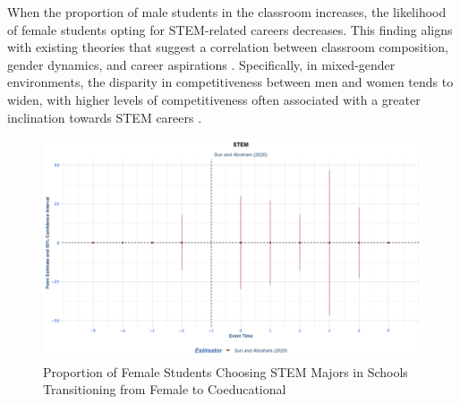 When the proportion of male students in the classroom increases, the likelihood of female students opting for STEM-related careers decreases. This finding aligns with existing theories that suggest a correlation between classroom composition, gender dynamics, and career aspirations \citep{Gneezy2003, Thomas2014}. Specifically, in mixed-gender environments, the disparity in competitiveness between men and women tends to widen, with higher levels of competitiveness often associated with a greater inclination towards STEM careers \citep{Thomas2014}.





\begin{figure}[H]
    \centering
        \includegraphics[width=\textwidth]{Graph/Results/stagered_ex_females_STEM.png}
        \caption{Proportion of Female Students Choosing STEM Majors in Schools Transitioning from Female to Coeducational}
    \label{fig:staggered_females_STEM}
\end{figure}

 
 

 